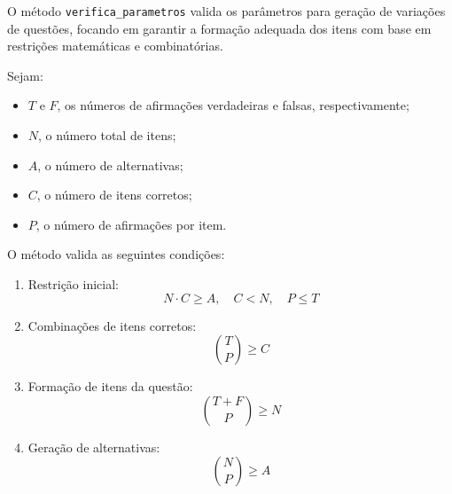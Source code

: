 O método \texttt{verifica\_parametros} valida os parâmetros para geração de variações de questões, focando em garantir a formação adequada dos itens com base em restrições matemáticas e combinatórias.

Sejam:
\begin{itemize}
    \item $T$ e $F$, os números de afirmações verdadeiras e falsas, respectivamente;
    \item $N$, o número total de itens;
    \item $A$, o número de alternativas;
    \item $C$, o número de itens corretos;
    \item $P$, o número de afirmações por item.
\end{itemize}

O método valida as seguintes condições:
\begin{enumerate}
    \item Restrição inicial:
    \begin{equation}
        N \cdot C \geq A, \quad C < N, \quad P \leq T
    \end{equation}
    \item Combinações de itens corretos:
    \begin{equation}
        \binom{T}{P} \geq C
    \end{equation}
    \item Formação de itens da questão:
    \begin{equation}
        \binom{T+F}{P} \geq N
    \end{equation}
    \item Geração de alternativas:
    \begin{equation}
        \binom{N}{P} \geq A
    \end{equation}
\end{enumerate}
    


